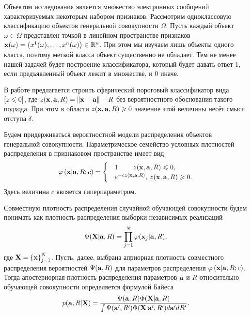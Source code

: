 Объектом исследования является множество электронных сообщений характеризуемых некоторым набором признаков.
Рассмотрим одноклассовую классификацию объектов генеральной совокупности $\Omega$.
Пусть каждый объект $\omega \in{\Omega}$  представлен точкой в линейном пространстве признаков
$\mathbf{x}(\omega)=\left(x^1(\omega),\ldots, x^n(\omega)\right) \in {\mathbb R^n}$. При этом мы изучаем лишь объекты одного класса, поэтому меткой класса объект существенно не обладает. 
Тем не менее нашей задачей будет построение классификатора, который будет давать ответ $1$, если предъявленный объект лежит в множестве, и $0$ иначе.

В работе \cite{} предлагается строить сферический пороговый классификатор вида 
$\left[z \leqslant 0\right] $, где $z(\mathbf{x},\mathbf{a},R)=\left\|{\mathbf{x}-\mathbf{a}}\right\|-R$ без вероятностного обоснования такого подхода. При этом в области $z(\mathbf{x}, \mathbf{a}, R) \geqslant 0$ значение этой величины несёт смысл отступа $\delta$.


Будем придерживаться вероятностной модели распределения объектов генеральной совокупности.
Параметрическое семейство условных плотностей распределения в признаковом пространстве имеет вид 
\begin{equation}
	\label{PhiXARC}
	\varphi \left( {\mathbf{x} | \mathbf{a},R;c} \right) =
		\begin{cases}
			&1 				\qquad  	\: 	z(\mathbf{x},\mathbf{a},R) \leqslant 0, \\
			&e^{-c z(\mathbf{x},\mathbf{a},R)}, 	\:	z(\mathbf{x},\mathbf{a},R) \geqslant 0.
		\end{cases} 
\end{equation}
Здесь величина $c$ является гиперпараметром.


Совместную плотность распределения случайной обучающей совокупности будем понимать как плотность распределения выборки независимых реализаций
$$\Phi(\mathbf{X}|\mathbf{a},R)=\prod_{j=1}^N \varphi(\mathbf{x}_j|\mathbf{a},R),$$ 
где $\mathbf{X}=\left\{\mathbf{x}\right\}_{j=1}^N$.
Пусть, далее, выбрана априорная плотность совместного распределения вероятностей $\Psi(\mathbf{a},R)$ для параметров распределения $\varphi \left(\mathbf{x} | \mathbf{a},R;c\right)$. 
Тогда апостериорная плотность распределения параметров $\mathbf{a}$ и $R$ относительно обучающей совокупности определяется формулой Байеса
\begin{equation}
	\label{Prob:aRX}
	p(\mathbf{a},R|\mathbf{X})
	= \frac {\Psi(\mathbf{a},R) \Phi(\mathbf{X}|\mathbf{a},R)}
			{\int {\Psi(\ensuremath{\mathbf{a}}',R') \Phi(\ensuremath{\mathbf{X}}|\ensuremath{\mathbf{a}}',R')d\ensuremath{\mathbf{a}}'dR'}}.
\end{equation}

